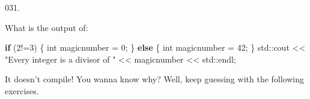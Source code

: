 \documentclass[]{book}
\newenvironment{Shaded}{}{}
\newcommand{\BuiltInTok}[1]{#1}
\newcommand{\ControlFlowTok}[1]{\textcolor[rgb]{0.00,0.44,0.13}{\textbf{#1}}}
\newcommand{\DataTypeTok}[1]{\textcolor[rgb]{0.56,0.13,0.00}{#1}}
\newcommand{\DecValTok}[1]{\textcolor[rgb]{0.25,0.63,0.44}{#1}}
\newcommand{\NormalTok}[1]{#1}
\newcommand{\StringTok}[1]{\textcolor[rgb]{0.25,0.44,0.63}{#1}}
\begin{document}
\begin{minipage}{\linewidth}\noindent
{\tiny 031.}\\
\begin{minipage}[t]{.485\linewidth}

What is the output of:

\begin{framed}

\begin{Shaded}
\begin{Highlighting}[]
\ControlFlowTok{if}\NormalTok{ (}\DecValTok{2}\NormalTok{!=}\DecValTok{3}\NormalTok{) \{}
  \DataTypeTok{int}\NormalTok{ magicnumber = }\DecValTok{0}\NormalTok{;}
\NormalTok{\} }\ControlFlowTok{else}\NormalTok{ \{}
  \DataTypeTok{int}\NormalTok{ magicnumber = }\DecValTok{42}\NormalTok{;}
\NormalTok{\}}
\BuiltInTok{std::}\NormalTok{cout << }\StringTok{"Every integer is a divisor of "}
\NormalTok{          << magicnumber << }\BuiltInTok{std::}\NormalTok{endl;}
\end{Highlighting}
\end{Shaded}

\end{framed}

\end{minipage}
\hfill
\begin{minipage}[t]{.485\linewidth}

It doesn't compile! You wanna know why? Well, keep guessing with the
following exercises.

\end{minipage}
\end{minipage}

\vspace{2mm}\noindent\hrulefill{}
\end{document}
